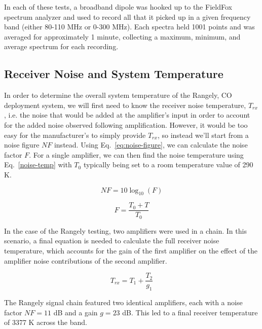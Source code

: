 \documentclass[11pt]{article}
\begin{document}
In each of these tests, a broadband dipole was hooked up to the FieldFox 
spectrum analyzer and used to record all that it picked up in a given frequency 
band (either 80-110 MHz or 0-300 MHz). Each spectra held 1001 points and was 
averaged for approximately 1 minute, collecting a maximum, minimum, and average 
spectrum for each recording.

\citep{pritchard-loeb2010}

\subsection{Receiver Noise and System Temperature}

In order to determine the overall system temperature of the Rangely, CO 
deployment system, we will first need to know the receiver noise temperature, 
$T_{rx}$, i.e.  the noise that would be added at the amplifier's input in order 
to account for the added noise observed following amplification. However, it 
would be too easy for the manufacturer's to simply provide $T_{rx}$, so instead 
we'll start from a noise figure $NF$ instead. Using 
Eq.~\eqref{eq:noise-figure}, we can calculate the noise factor $F$. For a 
single amplifier, we can then find the noise temperature using 
Eq.~\eqref{noise-temp} with $T_0$ typically being set to a room temperature 
value of 290 K.

\begin{equation}
    \label{eq:noise-figure}
    NF = 10 \log_{10}(F)
\end{equation}

\begin{equation}
    \label{eq:noise-temp}
    F = \frac{T_0 + T}{T_0}
\end{equation}

In the case of the Rangely testing, two amplifiers were used in a chain. In 
this scenario, a final equation is needed to calculate the full receiver noise 
temperature, which accounts for the gain of the first amplifier on the effect 
of the amplifier noise contributions of the second amplifier. 

\begin{equation}
    \label{eq:receiver-temp}
    T_{rx} = T_1 + \frac{T_2}{g_1}
\end{equation}

The Rangely signal chain featured two identical amplifiers, each with a noise 
factor $NF = 11$ dB and a gain $g = 23$ dB. This led to a final receiver 
temperature of 3377 K across the band.
\end{document}
